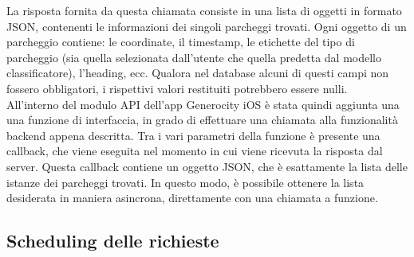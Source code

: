 La risposta fornita da questa chiamata consiste in una lista di oggetti in formato JSON, 
contenenti le informazioni dei singoli parcheggi trovati. Ogni oggetto di un parcheggio
contiene: le coordinate, il timestamp, le etichette del tipo di parcheggio (sia quella 
selezionata dall'utente che quella predetta dal modello classificatore), l'heading, ecc.
Qualora nel database alcuni di questi campi non fossero obbligatori, i rispettivi valori 
restituiti potrebbero essere nulli.\\
All'interno del modulo API dell'app Generocity iOS è stata quindi aggiunta una una funzione
di interfaccia, in grado di effettuare una chiamata alla funzionalità backend appena descritta.
Tra i vari parametri della funzione è presente una callback, che viene eseguita nel momento in cui
viene ricevuta la risposta dal server. Questa callback contiene un oggetto JSON, che è esattamente
la lista delle istanze dei parcheggi trovati. In questo modo, è possibile ottenere la lista desiderata in maniera asincrona, direttamente con una chiamata a funzione. 

\subsection{Scheduling delle richieste}


